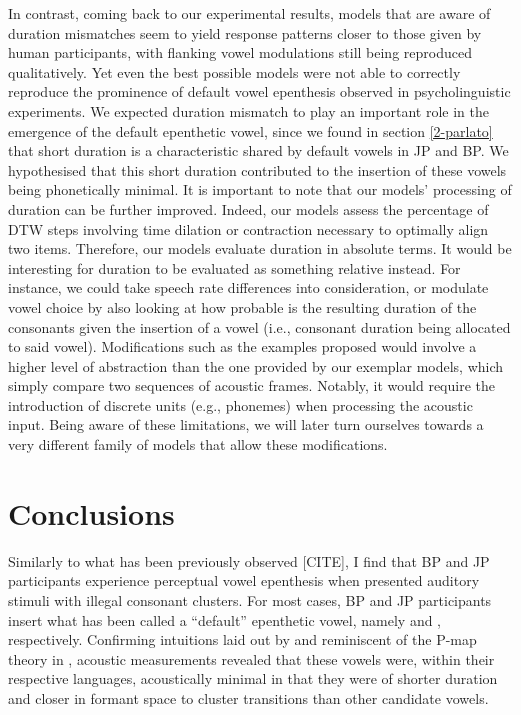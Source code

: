 In contrast, coming back to our experimental results, models that are aware of duration mismatches seem to yield response patterns closer to those given by human participants, with flanking vowel modulations still being reproduced qualitatively. Yet even the best possible models were not able to correctly reproduce the prominence of default vowel epenthesis observed in psycholinguistic experiments. We expected duration mismatch to play an important role in the emergence of the default epenthetic vowel, since we found in section \ref{2-parlato} that short duration is a characteristic shared by default vowels in JP and BP. We hypothesised that this short duration contributed to the insertion of these vowels being phonetically minimal.
It is important to note that our models' processing of duration can be further improved. Indeed, our models assess the percentage of DTW steps involving time dilation or contraction necessary to optimally align two items. Therefore, our models evaluate duration in absolute terms. It would be interesting for duration to be evaluated as something relative instead. For instance, we could take speech rate differences into consideration, or modulate vowel choice by also looking at how probable is the resulting duration of the consonants given the insertion of a vowel (i.e., consonant duration being allocated to said vowel). Modifications such as the examples proposed would involve a higher level of abstraction than the one provided by our exemplar models, which simply compare two sequences of acoustic frames. Notably, it would require the introduction of discrete units (e.g., phonemes) when processing the acoustic input. Being aware of these limitations, we will later turn ourselves towards a very different family of models that allow these modifications.


\newpage
\section{Conclusions}


Similarly to what has been previously observed \cite{dupoux1999, dehaene2000, dupoux2011, monahan2009, mattingley2015}[CITE], I find that BP and JP participants experience perceptual vowel epenthesis when presented auditory stimuli with illegal consonant clusters. For most cases, BP and JP participants insert what has been called a ``default'' epenthetic vowel, namely  and , respectively. Confirming intuitions laid out by \cite{dupoux2011} and reminiscent of the {\color{red}P-map theory in \cite{steriade2001}}, acoustic measurements revealed that these vowels were, within their respective languages, acoustically minimal in that they were of shorter duration and closer in formant space to cluster transitions than other candidate vowels. \\

